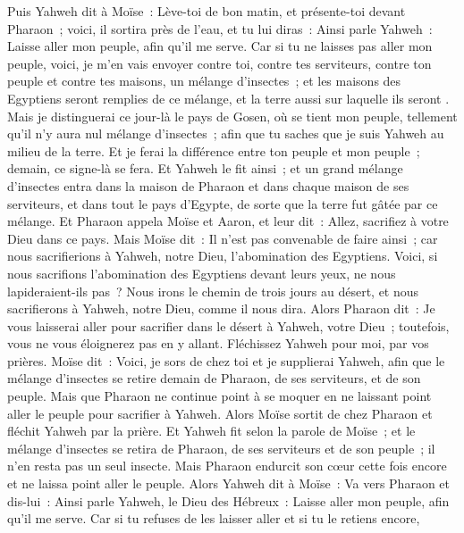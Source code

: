 \begin{multicols}{2}
Puis Yahweh dit à Moïse~: Lève-toi de bon matin, et présente-toi devant Pharaon~; voici, il sortira près de l'eau, et tu lui diras~: Ainsi parle Yahweh~: Laisse aller mon peuple, afin qu'il me serve.
Car si tu ne laisses pas aller mon peuple, voici, je m'en vais envoyer contre toi, contre tes serviteurs, contre ton peuple et contre tes maisons, un mélange d'insectes~; et les maisons des Egyptiens seront remplies de ce mélange, et la terre aussi sur laquelle ils seront .
Mais je distinguerai ce jour-là le pays de Gosen, où se tient mon peuple, tellement qu'il n'y aura nul mélange d'insectes~; afin que tu saches que je suis Yahweh au milieu de la terre.
Et je ferai la différence entre ton peuple et mon peuple~; demain, ce signe-là se fera.
Et Yahweh le fit ainsi~; et un grand mélange d'insectes entra dans la maison de Pharaon et dans chaque maison de ses serviteurs, et dans tout le pays d'Egypte, de sorte que la terre fut gâtée par ce mélange.
 Et Pharaon appela Moïse et Aaron, et leur dit~: Allez, sacrifiez à votre Dieu dans ce pays.
Mais Moïse dit~: Il n'est pas convenable de faire ainsi~; car nous sacrifierions à Yahweh, notre Dieu, l'abomination des Egyptiens. Voici, si nous sacrifions l'abomination des Egyptiens devant leurs yeux, ne nous lapideraient-ils pas~?
Nous irons le chemin de trois jours au désert, et nous sacrifierons à Yahweh, notre Dieu, comme il nous dira.
Alors Pharaon dit~: Je vous laisserai aller pour sacrifier dans le désert à Yahweh, votre Dieu~; toutefois, vous ne vous éloignerez pas en y allant. Fléchissez Yahweh pour moi, par vos prières.
Moïse dit~: Voici, je sors de chez toi et je supplierai Yahweh, afin que le mélange d'insectes se retire demain de Pharaon, de ses serviteurs, et de son peuple. Mais que Pharaon ne continue point à se moquer en ne laissant point aller le peuple pour sacrifier à Yahweh.
Alors Moïse sortit de chez Pharaon et fléchit Yahweh par la prière.
Et Yahweh fit selon la parole de Moïse~; et le mélange d'insectes se retira de Pharaon, de ses serviteurs et de son peuple~; il n'en resta pas un seul insecte.
Mais Pharaon endurcit son cœur cette fois encore et ne laissa point aller le peuple.
\VerseOne{}Alors Yahweh dit à Moïse~: Va vers Pharaon et dis-lui~: Ainsi parle Yahweh, le Dieu des Hébreux~: Laisse aller mon peuple, afin qu'il me serve.
Car si tu refuses de les laisser aller et si tu le retiens encore,

\end{multicols}
